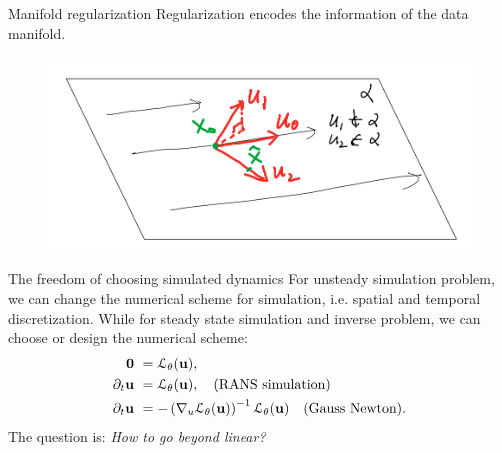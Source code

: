 \documentclass[aspectratio=169]{beamer}
\begin{document}
\begin{frame}{Manifold regularization}
	Regularization encodes the information of the data manifold.
	\begin{figure}[H]
		\centering
		\centerline{\includegraphics[width=0.9\linewidth]{fig/mfd.png}}
	\end{figure}
\end{frame}

\begin{frame}{The freedom of choosing simulated dynamics}
	For unsteady simulation problem, we can change the numerical scheme for simulation, i.e.
	spatial and temporal discretization. While for steady state simulation and inverse problem, we can 
	choose or design the numerical scheme:
	\begin{equation}
		\begin{aligned}
			\mathbf{0} & \ = \mathcal{L}_{\theta}(\mathbf{u}),	\\
		  \partial_t \mathbf{u} & \ = \mathcal{L}_{\theta}(\mathbf{u}), \quad \text{(RANS simulation)}   \\
		  \partial_t \mathbf{u} & \ = - \left( \nabla_u\mathcal{L}_{\theta}(\mathbf{u}) \right)^{-1} \mathcal{L}_{\theta}(\mathbf{u}) \quad \text{(Gauss Newton)}.
		\end{aligned}
	\end{equation}  
	The question is: \textit{How to go beyond linear?}
\end{frame}
\end{document}
